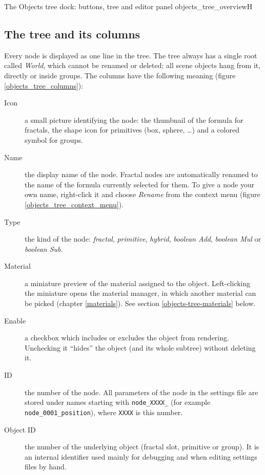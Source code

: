 {The Objects tree dock: buttons, tree and editor panel}
{objects_tree_overview}{H}

\subsection{The tree and its columns}\label{objects-tree-columns}

Every node is displayed as one line in the tree. The tree always has a single root called
\emph{World}, which cannot be renamed or deleted; all scene objects hang from it, directly or
inside groups. The columns have the following meaning (figure
\ref{objects_tree_columns}):

\begin{description}
	\item[Icon] a small picture identifying the node: the thumbnail of the formula for fractals,
	the shape icon for primitives (box, sphere, \ldots) and a colored symbol for groups.
	\item[Name] the display name of the node. Fractal nodes are automatically renamed to the name
	of the formula currently selected for them. To give a node your own name, right-click it and
 choose \emph{Rename} from the context menu (figure \ref{objects_tree_context_menu}).
	\item[Type] the kind of the node: \emph{fractal}, \emph{primitive}, \emph{hybrid},
	\emph{boolean Add}, \emph{boolean Mul} or \emph{boolean Sub}.
	\item[Material] a miniature preview of the material assigned to the object. Left-clicking the
	miniature opens the material manager, in which another material can be picked (chapter
	\ref{materials}). See section \ref{objects-tree-materials} below.
	\item[Enable] a checkbox which includes or excludes the object from rendering. Unchecking it
	``hides'' the object (and its whole subtree) without deleting it.
	\item[ID] the number of the node. All parameters of the node in the settings file are stored
	under names starting with \texttt{node\_XXXX\_} (for example \texttt{node\_0001\_position}),
	where \texttt{XXXX} is this number.
	\item[Object ID] the number of the underlying object (fractal slot, primitive or group). It is
	an internal identifier used mainly for debugging and when editing settings files by hand.
\end{description}

